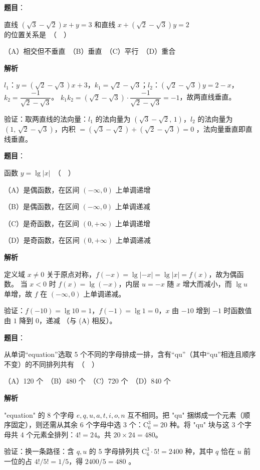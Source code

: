 \begin{answer}

\textbf{题目}：

直线 $(\sqrt{3} - \sqrt{2})x + y = 3$ 和直线 $x + (\sqrt{2} - \sqrt{3})y = 2$ 的位置关系是　（　）

（A）相交但不垂直　（B）垂直　（C）平行　（D）重合

\textbf{解析}

$l_1$：$y=(\sqrt2-\sqrt3)x+3$，$k_1=\sqrt2-\sqrt3$；$l_2$：$(\sqrt2-\sqrt3)y=2-x$，$k_2=\dfrac{-1}{\sqrt2-\sqrt3}$。
$k_1k_2=(\sqrt2-\sqrt3)\cdot\dfrac{-1}{\sqrt2-\sqrt3}=-1$，故两直线垂直。

验证：取两直线的法向量：$l_1$ 的法向量为 $(\sqrt3-\sqrt2,\,1)$，$l_2$ 的法向量为 $(1,\,\sqrt2-\sqrt3)$，内积 $=(\sqrt3-\sqrt2)+(\sqrt2-\sqrt3)=0$ ，法向量垂直即直线垂直。


\end{answer}
\begin{answer}

\textbf{题目}：

函数 $y = \lg |x|$　（　）

（A）是偶函数，在区间 $(-\infty, 0)$ 上单调递增

（B）是偶函数，在区间 $(-\infty, 0)$ 上单调递减

（C）是奇函数，在区间 $(0, +\infty)$ 上单调递增

（D）是奇函数，在区间 $(0, +\infty)$ 上单调递减

\textbf{解析}

定义域 $x\ne0$ 关于原点对称，$f(-x)=\lg|-x|=\lg|x|=f(x)$，故为偶函数。
当 $x<0$ 时 $f(x)=\lg(-x)$，内层 $u=-x$ 随 $x$ 增大而减小，而 $\lg u$ 单增，故 $f$ 在 $(-\infty,0)$ 上单调递减。

验证：$f(-10)=\lg10=1$，$f(-1)=\lg1=0$，$x$ 由 $-10$ 增到 $-1$ 时函数值由 $1$ 降到 $0$，递减 （与 (A) 相反）。


\end{answer}
\begin{answer}

\textbf{题目}：

从单词“equation”选取 5 个不同的字母排成一排，含有“qu”（其中“qu”相连且顺序不变）的不同排列共有　（　）

（A）120 个　（B）480 个　（C）720 个　（D）840 个

\textbf{解析}

"equation" 的 8 个字母 $e,q,u,a,t,i,o,n$ 互不相同。把 "qu" 捆绑成一个元素（顺序固定），则还需从其余 6 个字母中选 3 个：$\mathrm C_6^3=20$ 种。将 "qu" 块与这 3 个字母共 4 个元素全排列：$4!=24$。共 $20\times24=480$。

验证：换一条路径：含 $q,u$ 的 5 字母排列共 $\mathrm C_6^3\cdot5!=2400$ 种，其中 $q$ 恰在 $u$ 前一位的占 $4!/5!=1/5$，得 $2400/5=480$ 。


\end{answer}
